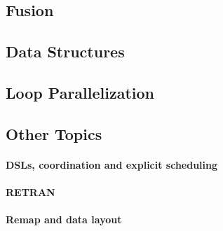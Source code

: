 \documentclass[a4paper]{article}
\begin{document}
\subsection{Fusion}
\label{sec:fusion}

\cite{Hwang:1995:AOS:209936.209949,
  Chakravarty:2001:FAF:507635.507661,
  Henriksen:2013:TGA:2502323.2502328,
  Chakravarty:2013:DPH:2502323.2508151,
  Lippmeier:2012:GPA:2364506.2364511}

\subsection{Data Structures}
\label{sec:data-structures}

\cite{47507, Keller:2010:RSP:1863543.1863582,
  Stucki:2015:RVP:2784731.2784739, Lowney:1981:CAI:567532.567533,
  Hall:1994:UHT:182409.156781, Arvind:1989:IDS:69558.69562}

\subsection{Loop Parallelization}
\label{sec:loop-parallelization}

\cite{Tang:1990:CTD:77726.255155, Maydan:1993:AFA:158511.158515,
  Knobe:1998:ASF:268946.268956,
  Henriksen:2014:BCI:2627373.2627388}

\subsection{Other Topics}
\label{sec:other-topics}

\paragraph{DSLs, coordination and explicit scheduling}

\cite{4228136, Ureche:2012:SCS:2103746.2103762}

\paragraph{RETRAN}

\cite{367042}

\paragraph{Remap and data layout}
\end{document}
